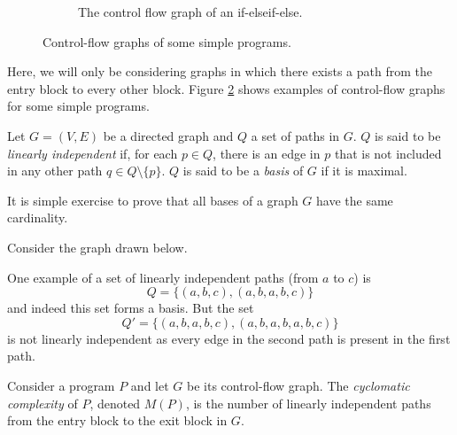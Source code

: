 \begin{figure}
{\begin{subfigure}{0.37\textwidth}
            \caption{The control flow graph of an if-elseif-else.}
            \label{fig:control-flow-ex-3}
        \end{subfigure}
    }
    \caption{Control-flow graphs of some simple programs.}
    \label{fig:control-flow-ex}
\end{figure}

Here, we will only be considering graphs in which there exists a path from the entry block to every other block. Figure \ref{fig:control-flow-ex} shows examples of control-flow graphs for some simple programs.

\begin{definition}
    Let $G = (V,E)$ be a directed graph and $Q$ a set of paths in $G$. $Q$ is said to be \emph{linearly independent} if, for each $p \in Q$, there is an edge in $p$ that is not included in any other path $q \in Q \setminus \{p\}$. $Q$ is said to be a \emph{basis} of $G$ if it is maximal.
\end{definition}

It is simple exercise to prove that all bases of a graph $G$ have the same cardinality.

\begin{example}
    Consider the graph drawn below.
    \begin{center}
    \end{center}
    One example of a set of linearly independent paths (from $a$ to $c$) is
    \[ Q = \{(a,b,c), (a,b,a,b,c)\} \]
    and indeed this set forms a basis. But the set
    \[ Q' = \{(a,b,a,b,c), (a,b,a,b,a,b,c)\}\]
    is not linearly independent as every edge in the second path is present in the first path.
\end{example}

\begin{definition}
    Consider a program $P$ and let $G$ be its control-flow graph. The \emph{cyclomatic complexity} of $P$, denoted $M(P)$, is the number of linearly independent paths from the entry block to the exit block in $G$.
\end{definition}

